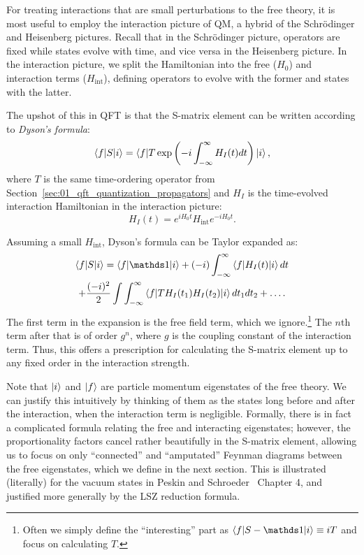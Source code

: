 For treating interactions that are small perturbations to the free theory, it is most useful to employ the interaction picture of QM, a hybrid of the Schr\"odinger and Heisenberg pictures.
Recall that in the Schr\"odinger picture, operators are fixed while states evolve with time, and vice versa in the Heisenberg picture.
In the interaction picture, we split the Hamiltonian into the free ($H_0$) and interaction terms ($H_{\mathrm{int}}$), defining operators to evolve with the former and states with the latter.

The upshot of this in QFT is that the S-matrix element can be written according to \textit{Dyson's formula}:
\begin{equation}
	\label{eq:01_qft_interactions_dysons_formula}
	\braket{f|S|i} = \braket{f|T\exp\left(-i\int_{-\infty}^\infty H_I(t)dt\right)|i},
\end{equation}
where $T$ is the same time-ordering operator from Section~\ref{sec:01_qft_quantization_propagators} and $H_I$ is the time-evolved interaction Hamiltonian in the interaction picture:
\begin{equation}
	\label{eq:01_qft_interactions_interaction_hamiltonian}
	H_I(t) = e^{iH_0t}H_{\mathrm{int}}e^{-iH_0t}.
\end{equation}

Assuming a small $H_{\mathrm{int}}$, Dyson's formula can be Taylor expanded as:
\begin{multline}
	\label{eq:01_qft_interactions_dysons_expansion}
	\braket{f|S|i} = \braket{f|\identity|i} + (-i) \int_{-\infty}^\infty \braket{f|H_I(t)|i}dt \\
	+ \frac{(-i)^2}{2} \int\int_{-\infty}^{\infty} \braket{f|T H_I(t_1)H_I(t_2)|i}dt_1dt_2 + \ldots.
\end{multline}
The first term in the expansion is the free field term, which we ignore.\footnote{Often we simply define the ``interesting'' part as $\braket{f|S-\identity|i} \equiv iT$ and focus on calculating $T$.}
The $n$th term after that is of order $g^n$, where $g$ is the coupling constant of the interaction term.
Thus, this offers a prescription for calculating the S-matrix element up to any fixed order in the interaction strength.

Note that $\ket{i}$ and $\ket{f}$ are particle momentum eigenstates of the free theory.
We can justify this intuitively by thinking of them as the states long before and after the interaction, when the interaction term is negligible.
Formally, there is in fact a complicated formula relating the free and interacting eigenstates; however, the proportionality factors cancel rather beautifully in the S-matrix element, allowing us to focus on only ``connected'' and ``amputated'' Feynman diagrams between the free eigenstates, which we define in the next section.
This is illustrated (literally) for the vacuum states in Peskin and Schroeder~\cite{Peskin:1995ev} Chapter 4, and justified more generally by the LSZ reduction formula.


